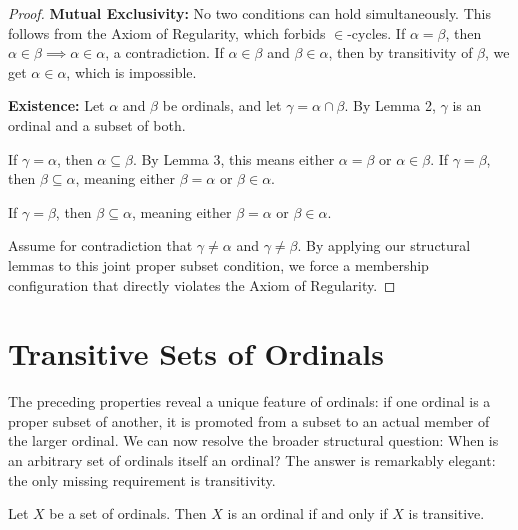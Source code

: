 \documentclass[11pt]{article}
\begin{document}
\begin{proof}
\textbf{Mutual Exclusivity:} No two conditions can hold simultaneously. This follows from the Axiom of Regularity, which forbids $\in$-cycles. If $\alpha = \beta$, then $\alpha \in \beta \implies \alpha \in \alpha$, a contradiction. If $\alpha \in \beta$ and $\beta \in \alpha$, then by transitivity of $\beta$, we get $\alpha \in \alpha$, which is impossible.

\medskip
\noindent\textbf{Existence:} Let $\alpha$ and $\beta$ be ordinals, and let $\gamma = \alpha \cap \beta$. By Lemma 2, $\gamma$ is an ordinal and a subset of both. 

If $\gamma = \alpha$, then $\alpha \subseteq \beta$. By Lemma 3, this means either $\alpha = \beta$ or $\alpha \in \beta$. If $\gamma = \beta$, then $\beta \subseteq \alpha$, meaning either $\beta = \alpha$ or $\beta \in \alpha$. 

If $\gamma = \beta$, then $\beta \subseteq \alpha$, meaning either $\beta = \alpha$ or $\beta \in \alpha$.

\medskip
Assume for contradiction that $\gamma \neq \alpha$ and $\gamma \neq \beta$. By applying our structural lemmas to this joint proper subset condition, we force a membership configuration that directly violates the Axiom of Regularity.


\end{proof}

\section{Transitive Sets of Ordinals}

The preceding properties reveal a unique feature of ordinals: if one ordinal is a proper subset of another, it is promoted from a subset to an actual member of the larger ordinal. We can now resolve the broader structural question: When is an arbitrary set of ordinals itself an ordinal? The answer is remarkably elegant: the only missing requirement is transitivity.

\begin{proposition}
Let $X$ be a set of ordinals. Then $X$ is an ordinal if and only if $X$ is transitive.
\end{proposition}
\end{document}
